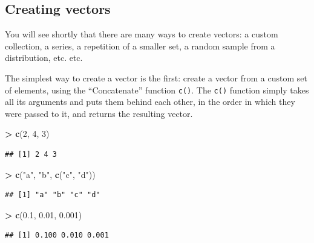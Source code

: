 \documentclass[]{book}
\newenvironment{Shaded}{\begin{snugshade}}{\end{snugshade}}
\newcommand{\DecValTok}[1]{\textcolor[rgb]{0.00,0.00,0.81}{#1}}
\newcommand{\FloatTok}[1]{\textcolor[rgb]{0.00,0.00,0.81}{#1}}
\newcommand{\KeywordTok}[1]{\textcolor[rgb]{0.13,0.29,0.53}{\textbf{#1}}}
\newcommand{\NormalTok}[1]{#1}
\newcommand{\OperatorTok}[1]{\textcolor[rgb]{0.81,0.36,0.00}{\textbf{#1}}}
\newcommand{\StringTok}[1]{\textcolor[rgb]{0.31,0.60,0.02}{#1}}
\begin{document}
\hypertarget{creating-vectors}{%
\subsection{Creating vectors}\label{creating-vectors}}

You will see shortly that there are many ways to create vectors: a custom collection, a series, a repetition of a smaller set, a random sample from a distribution, etc. etc.

The simplest way to create a vector is the first: create a vector from a custom set of elements, using the ``Concatenate'' function \texttt{c()}. The \texttt{c()} function simply takes all its arguments and puts them behind each other, in the order in which they were passed to it, and returns the resulting vector.

\begin{Shaded}
\begin{Highlighting}[]
\OperatorTok{>}\StringTok{ }\KeywordTok{c}\NormalTok{(}\DecValTok{2}\NormalTok{, }\DecValTok{4}\NormalTok{, }\DecValTok{3}\NormalTok{)}
\end{Highlighting}
\end{Shaded}

\begin{verbatim}
## [1] 2 4 3
\end{verbatim}

\begin{Shaded}
\begin{Highlighting}[]
\OperatorTok{>}\StringTok{ }\KeywordTok{c}\NormalTok{(}\StringTok{"a"}\NormalTok{, }\StringTok{"b"}\NormalTok{, }\KeywordTok{c}\NormalTok{(}\StringTok{"c"}\NormalTok{, }\StringTok{"d"}\NormalTok{))}
\end{Highlighting}
\end{Shaded}

\begin{verbatim}
## [1] "a" "b" "c" "d"
\end{verbatim}

\begin{Shaded}
\begin{Highlighting}[]
\OperatorTok{>}\StringTok{ }\KeywordTok{c}\NormalTok{(}\FloatTok{0.1}\NormalTok{, }\FloatTok{0.01}\NormalTok{, }\FloatTok{0.001}\NormalTok{)}
\end{Highlighting}
\end{Shaded}

\begin{verbatim}
## [1] 0.100 0.010 0.001
\end{verbatim}
\end{document}
